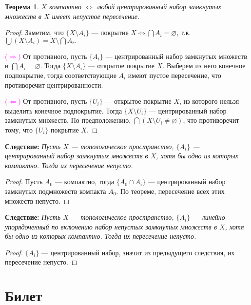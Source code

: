 \documentclass[a4paper,100pt]{article}
\theoremstyle{indented}
\newtheorem{theorem}{Теорема}
\begin{document}
    \begin{theorem}
        $X$ компактно $\iff$ любой центрированный набор замкнутых множеств в $X$ имеет непустое пересечение.
    \end{theorem}
    
    \begin{proof}
        Заметим, что $\{X \setminus A_i\}$ --- покрытие $X \iff \bigcap A_i = \varnothing$, т.к. $\bigcup (X \setminus A_i) = X \setminus \bigcap A_i.$
        
        \textcolor{magenta}{($\Rightarrow$)} От противного, пусть $\{A_i\}$ --- центрированный набор замкнутых множеств и $\bigcap A_i = \varnothing.$ Тогда $\{X \setminus A_i\}$ --- открытое покрытие $X$. Выберем из него конечное подпокрытие, тогда соответствующие $A_i$ имеют пустое пересечение, что противоречит центрированности.
        
        \textcolor{magenta}{($\Leftarrow$)} От противного, пусть $\{U_i\}$ --- открытое покрытие $X$, из которого нельзя выделить конечное подпокрытие. Тогда $\{X\setminus U_i\}$ --- центрированный набор замкнутых множеств. По предположению, $\bigcap (X \setminus U_i \neq \varnothing)$, что противоречит тому, что $\{U_i\}$ покрытие $X$. 
    \end{proof}
    
    \textbf{Следствие:}
    \textit{Пусть $X$ --- топологическое пространство, $\{A_i\}$ --- центрированный набор замкнутых множеств в $X$, хотя бы одно из которых компактно. Тогда их пересечение непусто.}
    \begin{proof}
        Пусть $A_0$ --- компактно, тогда $\{A_0 \cap A_i\}$ --- центрированный набор замкнутых подмножеств компакта $A_0$. По теореме, пересечение всех этих множеств непусто.
    \end{proof}
    
    \textbf{Следствие:}
    \textit{Пусть $X$ --- топологическое пространство, $\{A_i\}$ --- линейно упорядоченный по включению набор непустых замкнутых множеств в $X$, хотя бы одно из которых компактно. Тогда их пересечение непусто.}
    
    \begin{proof}
        $\{A_i\}$ --- центрированный набор, значит из предыдущего следствия, их пересечение непусто.
    \end{proof}

\section{Билет} \
\end{document}
